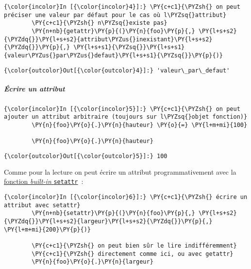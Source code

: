     \begin{Verbatim}[commandchars=\\\{\}]
{\color{incolor}In [{\color{incolor}4}]:} \PY{c+c1}{\PYZsh{} on peut préciser une valeur par défaut pour le cas où l\PYZsq{}attribut}
        \PY{c+c1}{\PYZsh{} n\PYZsq{}existe pas}
        \PY{n+nb}{getattr}\PY{p}{(}\PY{n}{foo}\PY{p}{,} \PY{l+s+s2}{\PYZdq{}}\PY{l+s+s2}{attribut\PYZus{}inexistant}\PY{l+s+s2}{\PYZdq{}}\PY{p}{,} \PY{l+s+s1}{\PYZsq{}}\PY{l+s+s1}{valeur\PYZus{}par\PYZus{}defaut}\PY{l+s+s1}{\PYZsq{}}\PY{p}{)}
\end{Verbatim}


\begin{Verbatim}[commandchars=\\\{\}]
{\color{outcolor}Out[{\color{outcolor}4}]:} 'valeur\_par\_defaut'
\end{Verbatim}
            
    \hypertarget{uxe9crire-un-attribut}{%
\subparagraph{Écrire un attribut}\label{uxe9crire-un-attribut}}

    \begin{Verbatim}[commandchars=\\\{\}]
{\color{incolor}In [{\color{incolor}5}]:} \PY{c+c1}{\PYZsh{} on peut ajouter un attribut arbitraire (toujours sur l\PYZsq{}objet fonction)}
        \PY{n}{foo}\PY{o}{.}\PY{n}{hauteur} \PY{o}{=} \PY{l+m+mi}{100}
        
        \PY{n}{foo}\PY{o}{.}\PY{n}{hauteur}
\end{Verbatim}


\begin{Verbatim}[commandchars=\\\{\}]
{\color{outcolor}Out[{\color{outcolor}5}]:} 100
\end{Verbatim}
            
    Comme pour la lecture on peut écrire un attribut programmativement avec
la
\href{https://docs.python.org/3/library/functions.html\#setattr}{fonction
\emph{built-in} \texttt{setattr}}~:

    \begin{Verbatim}[commandchars=\\\{\}]
{\color{incolor}In [{\color{incolor}6}]:} \PY{c+c1}{\PYZsh{} écrire un attribut avec setattr}
        \PY{n+nb}{setattr}\PY{p}{(}\PY{n}{foo}\PY{p}{,} \PY{l+s+s2}{\PYZdq{}}\PY{l+s+s2}{largeur}\PY{l+s+s2}{\PYZdq{}}\PY{p}{,} \PY{l+m+mi}{200}\PY{p}{)}
        
        \PY{c+c1}{\PYZsh{} on peut bien sûr le lire indifféremment}
        \PY{c+c1}{\PYZsh{} directement comme ici, ou avec getattr}
        \PY{n}{foo}\PY{o}{.}\PY{n}{largeur}
\end{Verbatim}



